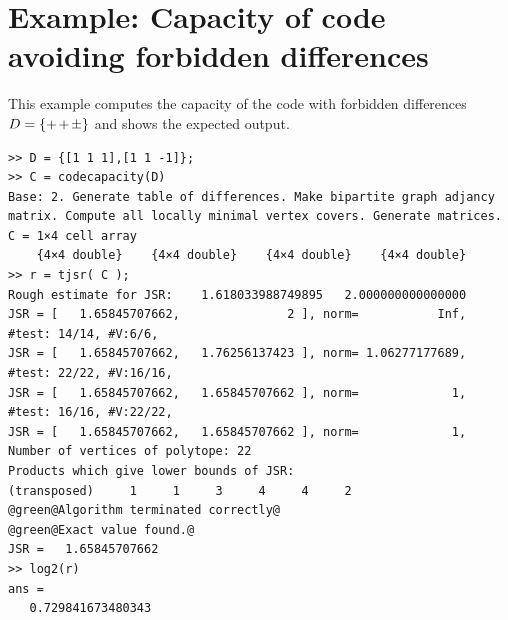 \section{Example: Capacity of code avoiding forbidden differences}
This example computes the capacity of the code with forbidden differences $D=\{\pp\pp\pm\}$
and shows the expected output.
\begin{lstlisting}
>> D = {[1 1 1],[1 1 -1]};
>> C = codecapacity(D)
Base: 2. Generate table of differences. Make bipartite graph adjancy matrix. Compute all locally minimal vertex covers. Generate matrices. 
C = 1×4 cell array
    {4×4 double}    {4×4 double}    {4×4 double}    {4×4 double}
>> r = tjsr( C );
Rough estimate for JSR:    1.618033988749895   2.000000000000000
JSR = [   1.65845707662,               2 ], norm=           Inf, #test: 14/14, #V:6/6, 
JSR = [   1.65845707662,   1.76256137423 ], norm= 1.06277177689, #test: 22/22, #V:16/16, 
JSR = [   1.65845707662,   1.65845707662 ], norm=             1, #test: 16/16, #V:22/22, 
JSR = [   1.65845707662,   1.65845707662 ], norm=             1, 
Number of vertices of polytope: 22
Products which give lower bounds of JSR: 
(transposed)     1     1     3     4     4     2
@green@Algorithm terminated correctly@
@green@Exact value found.@
JSR =   1.65845707662
>> log2(r)
ans =
   0.729841673480343
\end{lstlisting}    

